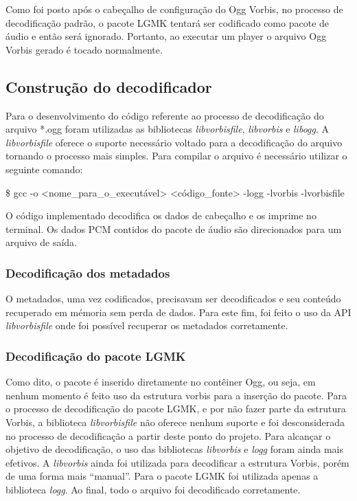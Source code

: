 Como foi posto após o cabeçalho de configuração do Ogg Vorbis, no processo de decodificação padrão, o pacote LGMK tentará ser codificado como pacote de áudio e então será ignorado. Portanto, ao executar um player o arquivo Ogg Vorbis gerado é tocado normalmente.

\subsection{Construção do decodificador}

Para o desenvolvimento do código referente ao processo de decodificação do arquivo *.ogg foram utilizadas as bibliotecas \textit{libvorbisfile}, \textit{libvorbis} e \textit{libogg}. A \textit{libvorbisfile} oferece o suporte necessário voltado para a decodificação do arquivo tornando o processo mais simples. Para compilar o arquivo é necessário utilizar o seguinte comando: 
	
   \$ gcc -o <nome\_para\_o\_executável> <código\_fonte> -logg -lvorbis -lvorbisfile

O código implementado decodifica os dados de cabeçalho e os imprime no terminal. Os dados PCM contidos do pacote de áudio são direcionados para um arquivo de saída.

\subsubsection{Decodificação dos metadados}

O metadados, uma vez codificados, precisavam ser decodificados e seu conteúdo recuperado em mémoria sem perda de dados. Para este fim, foi feito o uso da API \textit{libvorbisfile} onde foi possível recuperar os metadados corretamente.

\subsubsection{Decodificação do pacote LGMK}

Como dito, o pacote é inserido diretamente no contêiner Ogg, ou seja, em nenhum momento é feito uso da estrutura vorbis para a inserção do pacote. Para o processo de decodificação do pacote LGMK, e por não fazer parte da estrutura Vorbis, a biblioteca \textit{libvorbisfile} não oferece nenhum suporte e foi desconsiderada no processo de decodificação a partir deste ponto do projeto. Para alcançar o objetivo de decodificação, o uso das bibliotecas \textit{libvorbis} e \textit{logg} foram ainda mais efetivos. A \textit{libvorbis} ainda foi utilizada para decodificar a estrutura Vorbis, porém de uma forma mais ``manual''. Para o pacote LGMK foi utilizada apenas a biblioteca \textit{logg}. Ao final, todo o arquivo foi decodificado corretamente.

